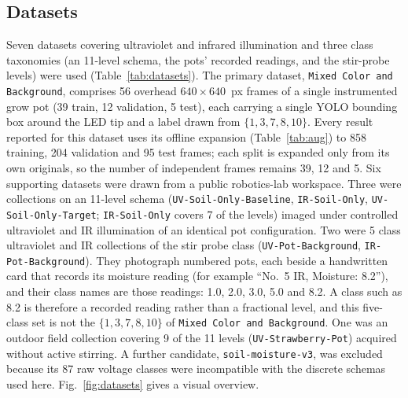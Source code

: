 ﻿\documentclass[journal]{IEEEtran}
\begin{document}
\subsection{Datasets}
\label{sec:datasets}
Seven datasets covering ultraviolet and infrared illumination and three class taxonomies (an 11-level schema, the pots' recorded readings, and the stir-probe levels) were used (Table~\ref{tab:datasets}). The primary dataset, \texttt{Mixed Color and Background}, comprises 56 overhead $640 \times 640$~px frames of a single instrumented grow pot (39 train, 12 validation, 5 test), each carrying a single YOLO bounding box around the LED tip and a label drawn from $\{1, 3, 7, 8, 10\}$. Every result reported for this dataset uses its offline expansion (Table~\ref{tab:aug}) to 858 training, 204 validation and 95 test frames; each split is expanded only from its own originals, so the number of independent frames remains 39, 12 and 5. Six supporting datasets were drawn from a public robotics-lab workspace. Three were collections on an 11-level schema (\texttt{UV-Soil-Only-Baseline}, \texttt{IR-Soil-Only}, \texttt{UV-Soil-Only-Target}; \texttt{IR-Soil-Only} covers 7 of the levels) imaged under controlled ultraviolet and IR illumination of an identical pot configuration. Two were 5 class ultraviolet and IR collections of the stir probe class (\texttt{UV-Pot-Background}, \texttt{IR-Pot-Background}). They photograph numbered pots, each beside a handwritten card that records its moisture reading (for example ``No.~5 IR, Moisture: 8.2''), and their class names are those readings: 1.0, 2.0, 3.0, 5.0 and 8.2. A class such as 8.2 is therefore a recorded reading rather than a fractional level, and this five-class set is not the $\{1, 3, 7, 8, 10\}$ of \texttt{Mixed Color and Background}. One was an outdoor field collection covering 9 of the 11 levels (\texttt{UV-Strawberry-Pot}) acquired without active stirring. A further candidate, \texttt{soil-moisture-v3}, was excluded because its 87 raw voltage classes were incompatible with the discrete schemas used here. Fig.~\ref{fig:datasets} gives a visual overview.
\end{document}

